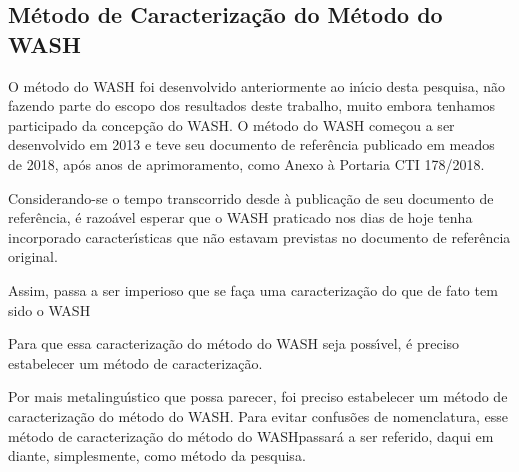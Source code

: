 \documentclass[
12pt,		%
openright,	%
twoside,  %
a4paper,			%
chapter=TITLE,		%
english,			%
french,				%
spanish,			%
brazil				%
]{USPSC-classe/USPSC_RedarTex}
\begin{document}
\subsection[M\'etodo de Caracteriza\c{c}\~ao do M\'etodo do WASH]{M\'etodo de Caracteriza\c{c}\~ao do M\'etodo do WASH}\label{M\'etodo de Caracteriza\c{c}\~ao do M\'etodo do WASH}
O m\'etodo do WASH foi desenvolvido anteriormente ao in\'{\i}cio desta pesquisa, n\~ao fazendo parte do escopo dos resultados deste trabalho, muito embora tenhamos participado da concep\c{c}\~ao do WASH. O m\'etodo do WASH come\c{c}ou a ser desenvolvido em 2013 e teve seu documento de refer\^encia publicado em meados de 2018, ap\'os anos de aprimoramento, como Anexo \`a Portaria CTI 178/2018.








Considerando-se o tempo transcorrido desde \`a publica\c{c}\~ao de seu documento de refer\^encia, \'e razo\'avel esperar que o WASH praticado nos dias de hoje tenha incorporado caracter\'{\i}sticas que n\~ao estavam previstas no documento de refer\^encia original.








Assim, passa a ser imperioso que se fa\c{c}a uma caracteriza\c{c}\~ao do que de fato tem sido o WASH








Para que essa caracteriza\c{c}\~ao do m\'etodo do WASH seja poss\'{\i}vel, \'e preciso estabelecer um m\'etodo de caracteriza\c{c}\~ao.








Por mais metalingu\'{\i}stico que possa parecer, foi preciso estabelecer um m\'etodo de caracteriza\c{c}\~ao do m\'etodo do WASH. Para evitar confus\~oes de nomenclatura, esse \textquotedbl m\'etodo de caracteriza\c{c}\~ao do m\'etodo do WASH\textquotedbl  passar\'a a ser referido, daqui em diante, simplesmente, como \textquotedbl m\'etodo da pesquisa\textquotedbl .
\end{document}
